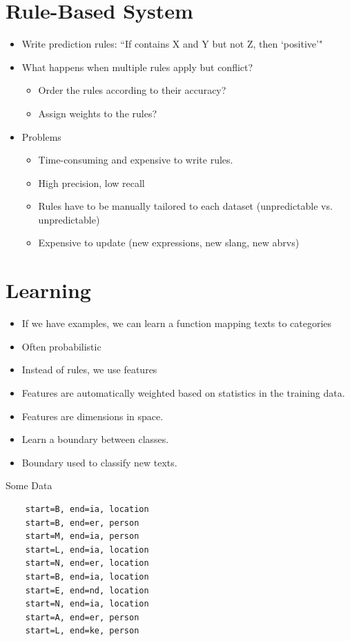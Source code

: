 \documentclass[11pt,letterpaper]{article}
\begin{document}
\section{Rule-Based System}

\begin{itemize}
  \item Write prediction rules: ``If contains X and Y but not Z, then `positive'"
  \item What happens when multiple rules apply but conflict?
    \begin{itemize}
      \item Order the rules according to their accuracy?
      \item Assign weights to the rules?
    \end{itemize}
  \item Problems
    \begin{itemize}
      \item Time-consuming and expensive to write rules.
      \item High precision, low recall
      \item Rules have to be manually tailored to each dataset (unpredictable vs. unpredictable)
      \item Expensive to update (new expressions, new slang, new abrvs)
    \end{itemize}
\end{itemize}

\section{Learning}

\begin{itemize}
  \item If we have examples, we can learn a function mapping texts to categories
  \item Often probabilistic
  \item Instead of rules, we use features
  \item Features are automatically weighted based on statistics in the training data.
  \item Features are dimensions in space.
  \item Learn a boundary between classes.
  \item Boundary used to classify new texts.
\end{itemize}

Some Data
\begin{verbatim}
    start=B, end=ia, location
    start=B, end=er, person
    start=M, end=ia, person
    start=L, end=ia, location
    start=N, end=er, location
    start=B, end=ia, location
    start=E, end=nd, location
    start=N, end=ia, location
    start=A, end=er, person
    start=L, end=ke, person
\end{verbatim}
\end{document}
